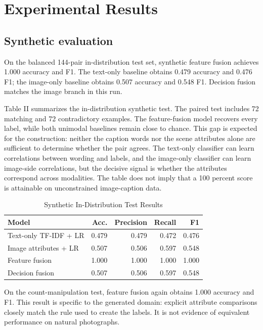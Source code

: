 \documentclass[conference]{IEEEtran}
\begin{document}
\section{Experimental Results}
\subsection{Synthetic evaluation}
On the balanced 144-pair in-distribution test set, synthetic feature fusion achieves 1.000 accuracy and F1. The text-only baseline obtains 0.479 accuracy and 0.476 F1; the image-only baseline obtains 0.507 accuracy and 0.548 F1. Decision fusion matches the image branch in this run.

Table II summarizes the in-distribution synthetic test. The paired test includes 72 matching and 72 contradictory examples. The feature-fusion model recovers every label, while both unimodal baselines remain close to chance. This gap is expected for the construction: neither the caption words nor the scene attributes alone are sufficient to determine whether the pair agrees. The text-only classifier can learn correlations between wording and labels, and the image-only classifier can learn image-side correlations, but the decisive signal is whether the attributes correspond across modalities. The table does not imply that a 100 percent score is attainable on unconstrained image-caption data. \begin{table}[t]
\caption{Synthetic In-Distribution Test Results}\label{tab:synth}\centering\footnotesize
\begin{tabular}{lrrrr}
\hline Model & Acc. & Precision & Recall & F1\\\hline
Text-only TF-IDF + LR & 0.479 & 0.479 & 0.472 & 0.476\\
Image attributes + LR & 0.507 & 0.506 & 0.597 & 0.548\\
Feature fusion & 1.000 & 1.000 & 1.000 & 1.000\\
Decision fusion & 0.507 & 0.506 & 0.597 & 0.548\\\hline
\end{tabular}
\end{table}

On the count-manipulation test, feature fusion again obtains 1.000 accuracy and F1. This result is specific to the generated domain: explicit attribute comparisons closely match the rule used to create the labels. It is not evidence of equivalent performance on natural photographs.
\end{document}
